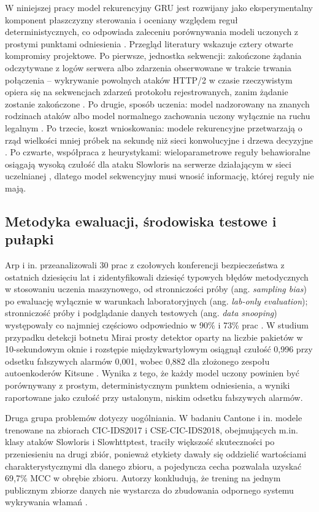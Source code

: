 \documentclass[a4paper,12pt]{article}
\begin{document}
W niniejszej pracy model rekurencyjny GRU jest rozwijany jako eksperymentalny komponent płaszczyzny sterowania i oceniany względem reguł deterministycznych, co odpowiada zaleceniu porównywania modeli uczonych z prostymi punktami odniesienia \cite{arp2022dos}. Przegląd literatury wskazuje cztery otwarte kompromisy projektowe. Po pierwsze, jednostka sekwencji: zakończone żądania odczytywane z logów serwera albo zdarzenia obserwowane w trakcie trwania połączenia -- wykrywanie powolnych ataków HTTP/2 w czasie rzeczywistym opiera się na sekwencjach zdarzeń protokołu rejestrowanych, zanim żądanie zostanie zakończone \cite{tripathi2024delays}. Po drugie, sposób uczenia: model nadzorowany na znanych rodzinach ataków albo model normalnego zachowania uczony wyłącznie na ruchu legalnym \cite{tripathi2024delays}. Po trzecie, koszt wnioskowania: modele rekurencyjne przetwarzają o rząd wielkości mniej próbek na sekundę niż sieci konwolucyjne i drzewa decyzyjne \cite{doriguzzicorin2020lucid,almarazrivera2022transport}. Po czwarte, współpraca z heurystykami: wieloparametrowe reguły behawioralne osiągają wysoką czułość dla ataku Slowloris na serwerze działającym w sieci uczelnianej \cite{sood2023slowtrack}, dlatego model sekwencyjny musi wnosić informację, której reguły nie mają.

\subsection{Metodyka ewaluacji, środowiska testowe i pułapki}\label{sec:metodyka}
Arp i in. przeanalizowali 30 prac z czołowych konferencji bezpieczeństwa z ostatnich dziesięciu lat i zidentyfikowali dziesięć typowych błędów metodycznych w stosowaniu uczenia maszynowego, od stronniczości próby (ang. \textit{sampling bias}) po ewaluację wyłącznie w warunkach laboratoryjnych (ang. \textit{lab-only evaluation}); stronniczość próby i podglądanie danych testowych (ang. \textit{data snooping}) występowały co najmniej częściowo odpowiednio w 90\% i 73\% prac \cite{arp2022dos}. W studium przypadku detekcji botnetu Mirai prosty detektor oparty na liczbie pakietów w 10-sekundowym oknie i rozstępie międzykwartylowym osiągnął czułość 0,996 przy odsetku fałszywych alarmów 0,001, wobec 0,882 dla złożonego zespołu autoenkoderów Kitsune \cite{arp2022dos}. Wynika z tego, że każdy model uczony powinien być porównywany z prostym, deterministycznym punktem odniesienia, a wyniki raportowane jako czułość przy ustalonym, niskim odsetku fałszywych alarmów.

Druga grupa problemów dotyczy uogólniania. W badaniu Cantone i in. modele trenowane na zbiorach CIC-IDS2017 i CSE-CIC-IDS2018, obejmujących m.in. klasy ataków Slowloris i Slowhttptest, traciły większość skuteczności po przeniesieniu na drugi zbiór, ponieważ etykiety dawały się oddzielić wartościami charakterystycznymi dla danego zbioru, a pojedyncza cecha pozwalała uzyskać 69,7\% MCC w obrębie zbioru. Autorzy konkludują, że trening na jednym publicznym zbiorze danych nie wystarcza do zbudowania odpornego systemu wykrywania włamań \cite{cantone2024machine}.
\end{document}
